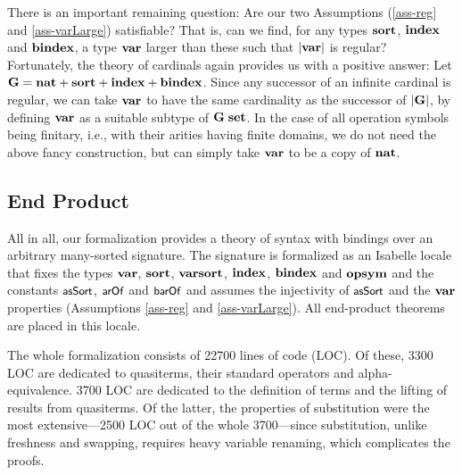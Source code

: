 \documentclass{llncs}
\begin{document}
%
There is an important remaining question: Are our two Assumptions 
(\ref{ass-reg} and \ref{ass-varLarge}) satisfiable? That is, 
can we find, for any types $\mbox{\bf sort}$, $\mbox{\bf index}$ and $\mbox{\bf bindex}$, 
a type $\mbox{\bf var}$ larger than these such that $|\mbox{\bf var}|$ is regular? 
%
Fortunately, the theory of cardinals 
again provides us with a positive answer: 
Let $\bf G = \mbox{\bf nat} + \mbox{\bf sort} + \mbox{\bf index} + \mbox{\bf bindex}$. 
Since %
any successor of an infinite cardinal 
is regular, we can 
take $\mbox{\bf var}$ to have the same cardinality as the successor of $|\bf G|$, by defining 
$\mbox{\bf var}$ as a suitable subtype of $\bf G\;\mbox{\bf set}$. %
In the case of all operation symbols being finitary, i.e., with 
their arities having finite domains, we do not need the above fancy construction,  
but can simply take $\mbox{\bf var}$ to be a copy of $\mbox{\bf nat}$.  



\subsection{End Product}
\label{subsec-endProd}

All in all, %
our formalization provides a theory of syntax with bindings over an arbitrary many-sorted signature.
The signature is formalized as an Isabelle locale \cite{Locales} 
that fixes 
the types $\mbox{\bf var}$, $\mbox{\bf sort}$, $\mbox{\bf varsort}$, $\mbox{\bf index}$, $\mbox{\bf bindex}$ and $\mbox{\bf opsym}$ 
and the constants $\mbox{\rm\textsf{\small asSort}}$, $\mbox{\rm\textsf{\small arOf}}$ and $\mbox{\rm\textsf{\small barOf}}$ and 
assumes the injectivity of $\mbox{\rm\textsf{\small asSort}}$ and the $\mbox{\bf var}$ 
properties (Assumptions \ref{ass-reg} and \ref{ass-varLarge}).     
All end-product theorems are placed %
in this locale. 


The whole formalization 
consists of 22700 lines of code (LOC). Of these, 3300 LOC are dedicated 
to quasiterms, their standard operators and alpha-equivalence. 
3700 LOC are dedicated to the definition of terms and the lifting of results from quasiterms.
Of the latter, the properties of substitution were the most extensive---2500 LOC out of 
the whole 3700---since substitution, unlike freshness and swapping, 
requires heavy variable renaming, which complicates the proofs. 
\end{document}

